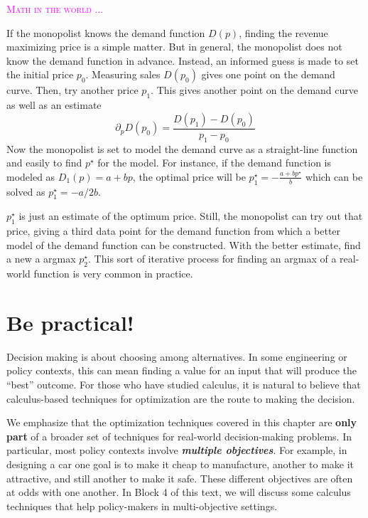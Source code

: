 \documentclass[
  letterpaper,
  DIV=11,
  numbers=noendperiod,
  oneside]{scrreprt}
\newenvironment{intheworld}%
{%
\textcolor{magenta}{\hrulefill}%
  \par\vspace{.3\baselineskip}%
  \textcolor{magenta}{\scshape Math in the world ...}%
  \par\vspace{\baselineskip}%
}%
{\textcolor{magenta}{\hrulefill}}
\begin{document}
\begin{intheworld}
If the monopolist knows the demand function \(D(p)\), finding the
revenue maximizing price is a simple matter. But in general, the
monopolist does not know the demand function in advance. Instead, an
informed guess is made to set the initial price \(p_0\). Measuring sales
\(D(p_0)\) gives one point on the demand curve. Then, try another price
\(p_1\). This gives another point on the demand curve as well as an
estimate \[\partial_p D(p_0) = \frac{D(p_1) - D(p_0)}{p_1 - p_0}\] Now
the monopolist is set to model the demand curve as a straight-line
function and easily to find \(p^\star\) for the model. For instance, if
the demand function is modeled as \(D_1 (p) = a + b p\), the optimal
price will be \(p^\star_1 = - \frac{a + b p^\star}{b}\) which can be
solved as \(p^\star_1 = - a/2b\).

\(p^\star_1\) is just an estimate of the optimum price. Still, the
monopolist can try out that price, giving a third data point for the
demand function from which a better model of the demand function can be
constructed. With the better estimate, find a new a argmax
\(p^\star_2\). This sort of iterative process for finding an argmax of a
real-world function is very common in practice.

\end{intheworld}

\hypertarget{sec-flat-on-top}{%
\section{Be practical!}\label{sec-flat-on-top}}

Decision making is about choosing among alternatives. In some
engineering or policy contexts, this can mean finding a value for an
input that will produce the ``best'' outcome. For those who have studied
calculus, it is natural to believe that calculus-based techniques for
optimization are the route to making the decision.

We emphasize that the optimization techniques covered in this chapter
are \textbf{only part} of a broader set of techniques for real-world
decision-making problems. In particular, most policy contexts involve
\textbf{\emph{multiple objectives}}. For example, in designing a car one
goal is to make it cheap to manufacture, another to make it attractive,
and still another to make it safe. These different objectives are often
at odds with one another. In Block 4 of this text, we will discuss some
calculus techniques that help policy-makers in multi-objective settings.
\end{document}

